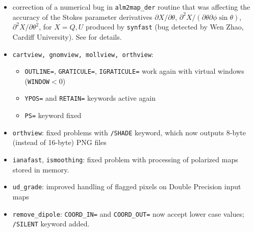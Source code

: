 \documentclass[12pt,twoside]{article}
\newcounter{append}
\begin{document}
{{%
%
%
 \begin{itemize}
	\item
	correction of a numerical bug in {\tt alm2map\_der} routine that was
affecting
	the accuracy of the Stokes parameter derivatives 
$\partial X/\partial\theta$, 
$\partial^2 X/(\partial\theta\partial\phi\sin\theta)$, 
$\partial^2 X/\partial \theta^2$, 
for $X=Q,U$ produced by {\tt synfast}  (bug detected by Wen Zhao,
Cardiff University). See 
 for details.
 \end{itemize}
%
 \begin{itemize}
	\item {\tt cartview, gnomview, mollview, orthview}:
        \begin{itemize}
		\item {\tt OUTLINE=}, {\tt GRATICULE=}, {\tt IGRATICULE=} work
again with virtual windows ({\tt WINDOW}$<0$)
		\item {\tt YPOS=} and {\tt RETAIN=} keywords active again
		\item {\tt PS=} keyword fixed %
	\end{itemize}
	\item {\tt orthview}:
		fixed problems with {\tt /SHADE} keyword, which now
outputs 8-byte (instead of 16-byte) PNG files
	\item {\tt ianafast}, {\tt ismoothing}: fixed problem with processing of
polarized maps stored in memory.
	\item {\tt ud\_grade}: improved handling of flagged pixels on Double
Precision input maps
	\item {\tt remove\_dipole}: {\tt COORD\_IN=} and {\tt COORD\_OUT=} now
accept lower case values; {\tt /SILENT} keyword added.
 \end{itemize}

}}
\end{document}
